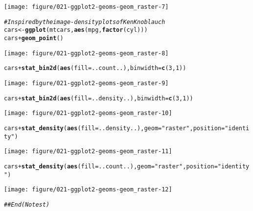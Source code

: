 \documentclass[a4paper,titlepage]{tufte-handout}\usepackage[]{graphicx}\usepackage[]{color}
\makeatletter
\def\maxwidth{ %
  \ifdim\Gin@nat@width>\linewidth
    \linewidth
  \else
    \Gin@nat@width
  \fi
}
\newcommand{\hlnum}[1]{\textcolor[rgb]{0.686,0.059,0.569}{#1}}%
\newcommand{\hlstr}[1]{\textcolor[rgb]{0.192,0.494,0.8}{#1}}%
\newcommand{\hlcom}[1]{\textcolor[rgb]{0.678,0.584,0.686}{\textit{#1}}}%
\newcommand{\hlopt}[1]{\textcolor[rgb]{0,0,0}{#1}}%
\newcommand{\hlstd}[1]{\textcolor[rgb]{0.345,0.345,0.345}{#1}}%
\newcommand{\hlkwb}[1]{\textcolor[rgb]{0.69,0.353,0.396}{#1}}%
\newcommand{\hlkwc}[1]{\textcolor[rgb]{0.333,0.667,0.333}{#1}}%
\newcommand{\hlkwd}[1]{\textcolor[rgb]{0.737,0.353,0.396}{\textbf{#1}}}%
\newenvironment{kframe}{%
 \def\at@end@of@kframe{}%
 \ifinner\ifhmode%
  \def\at@end@of@kframe{\end{minipage}}%
  \begin{minipage}{\columnwidth}%
 \fi\fi%
 \def\FrameCommand##1{\hskip\@totalleftmargin \hskip-\fboxsep
 \colorbox{shadecolor}{##1}\hskip-\fboxsep
     \hskip-\linewidth \hskip-\@totalleftmargin \hskip\columnwidth}%
 \MakeFramed {\advance\hsize-\width
   \@totalleftmargin\z@ \linewidth\hsize
   \@setminipage}}%
 {\par\unskip\endMakeFramed%
 \at@end@of@kframe}
\newenvironment{knitrout}{}{} %
\makeatother
\begin{document}
\begin{knitrout}
\texttt{[image: figure/021-ggplot2-geoms-geom\_raster-7]} 
\begin{kframe}\begin{alltt}
\hlcom{# Inspired by the image-density plots of Ken Knoblauch}
\hlstd{cars} \hlkwb{<-} \hlkwd{ggplot}\hlstd{(mtcars,} \hlkwd{aes}\hlstd{(mpg,} \hlkwd{factor}\hlstd{(cyl)))}
\hlstd{cars} \hlopt{+} \hlkwd{geom_point}\hlstd{()}
\end{alltt}
\end{kframe}
\texttt{[image: figure/021-ggplot2-geoms-geom\_raster-8]} 
\begin{kframe}\begin{alltt}
\hlstd{cars} \hlopt{+} \hlkwd{stat_bin2d}\hlstd{(}\hlkwd{aes}\hlstd{(}\hlkwc{fill} \hlstd{= ..count..),} \hlkwc{binwidth} \hlstd{=} \hlkwd{c}\hlstd{(}\hlnum{3}\hlstd{,}\hlnum{1}\hlstd{))}
\end{alltt}
\end{kframe}
\texttt{[image: figure/021-ggplot2-geoms-geom\_raster-9]} 
\begin{kframe}\begin{alltt}
\hlstd{cars} \hlopt{+} \hlkwd{stat_bin2d}\hlstd{(}\hlkwd{aes}\hlstd{(}\hlkwc{fill} \hlstd{= ..density..),} \hlkwc{binwidth} \hlstd{=} \hlkwd{c}\hlstd{(}\hlnum{3}\hlstd{,}\hlnum{1}\hlstd{))}
\end{alltt}
\end{kframe}
\texttt{[image: figure/021-ggplot2-geoms-geom\_raster-10]} 
\begin{kframe}\begin{alltt}
\hlstd{cars} \hlopt{+} \hlkwd{stat_density}\hlstd{(}\hlkwd{aes}\hlstd{(}\hlkwc{fill} \hlstd{= ..density..),} \hlkwc{geom} \hlstd{=} \hlstr{"raster"}\hlstd{,} \hlkwc{position} \hlstd{=} \hlstr{"identity"}\hlstd{)}
\end{alltt}
\end{kframe}
\texttt{[image: figure/021-ggplot2-geoms-geom\_raster-11]} 
\begin{kframe}\begin{alltt}
\hlstd{cars} \hlopt{+} \hlkwd{stat_density}\hlstd{(}\hlkwd{aes}\hlstd{(}\hlkwc{fill} \hlstd{= ..count..),} \hlkwc{geom} \hlstd{=} \hlstr{"raster"}\hlstd{,} \hlkwc{position} \hlstd{=} \hlstr{"identity"}\hlstd{)}
\end{alltt}
\end{kframe}
\texttt{[image: figure/021-ggplot2-geoms-geom\_raster-12]} 
\begin{kframe}\begin{alltt}
\hlcom{## End(No test)}
\end{alltt}
\end{kframe}
\end{knitrout}
\end{document}
